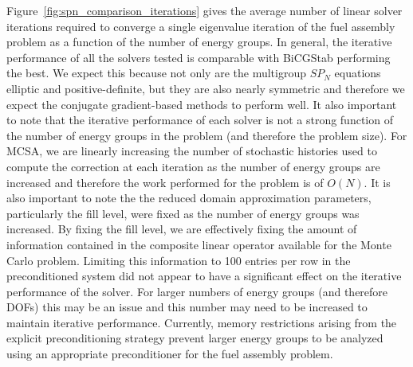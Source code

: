 Figure~\ref{fig:spn_comparison_iterations} gives the average number of
linear solver iterations required to converge a single eigenvalue
iteration of the fuel assembly problem as a function of the number of
energy groups. In general, the iterative performance of all the
solvers tested is comparable with BiCGStab performing the best. We
expect this because not only are the multigroup $SP_N$ equations
elliptic and positive-definite, but they are also nearly symmetric and
therefore we expect the conjugate gradient-based methods to perform
well. It also important to note that the iterative performance of each
solver is not a strong function of the number of energy groups in the
problem (and therefore the problem size). For MCSA, we are linearly
increasing the number of stochastic histories used to compute the
correction at each iteration as the number of energy groups are
increased and therefore the work performed for the problem is of
$O(N)$. It is also important to note the the reduced domain
approximation parameters, particularly the fill level, were fixed as
the number of energy groups was increased. By fixing the fill level,
we are effectively fixing the amount of information contained in the
composite linear operator available for the Monte Carlo
problem. Limiting this information to 100 entries per row in the
preconditioned system did not appear to have a significant effect on
the iterative performance of the solver. For larger numbers of energy
groups (and therefore DOFs) this may be an issue and this number may
need to be increased to maintain iterative performance. Currently,
memory restrictions arising from the explicit preconditioning strategy
prevent larger energy groups to be analyzed using an appropriate
preconditioner for the fuel assembly problem.

